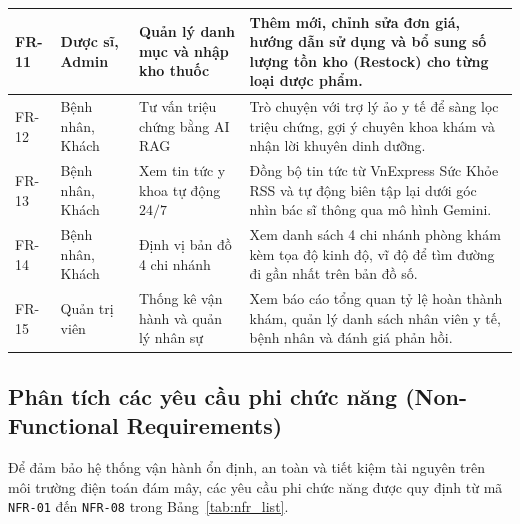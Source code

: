 \begin{longtable}{|p{1.6cm}|p{3.0cm}|p{4.2cm}|p{5.2cm}|}
\hline
FR-11 & Dược sĩ, Admin & Quản lý danh mục và nhập kho thuốc & Thêm mới, chỉnh sửa đơn giá, hướng dẫn sử dụng và bổ sung số lượng tồn kho (Restock) cho từng loại dược phẩm. \\
\hline
FR-12 & Bệnh nhân, Khách & Tư vấn triệu chứng bằng AI RAG & Trò chuyện với trợ lý ảo y tế để sàng lọc triệu chứng, gợi ý chuyên khoa khám và nhận lời khuyên dinh dưỡng. \\
\hline
FR-13 & Bệnh nhân, Khách & Xem tin tức y khoa tự động $24/7$ & Đồng bộ tin tức từ VnExpress Sức Khỏe RSS và tự động biên tập lại dưới góc nhìn bác sĩ thông qua mô hình Gemini. \\
\hline
FR-14 & Bệnh nhân, Khách & Định vị bản đồ 4 chi nhánh & Xem danh sách 4 chi nhánh phòng khám kèm tọa độ kinh độ, vĩ độ để tìm đường đi gần nhất trên bản đồ số. \\
\hline
FR-15 & Quản trị viên & Thống kê vận hành và quản lý nhân sự & Xem báo cáo tổng quan tỷ lệ hoàn thành khám, quản lý danh sách nhân viên y tế, bệnh nhân và đánh giá phản hồi. \\
\hline
\end{longtable}

\subsection{Phân tích các yêu cầu phi chức năng (Non-Functional Requirements)}

Để đảm bảo hệ thống vận hành ổn định, an toàn và tiết kiệm tài nguyên trên môi trường điện toán đám mây, các yêu cầu phi chức năng được quy định từ mã \texttt{NFR-01} đến \texttt{NFR-08} trong Bảng~\ref{tab:nfr_list}.

